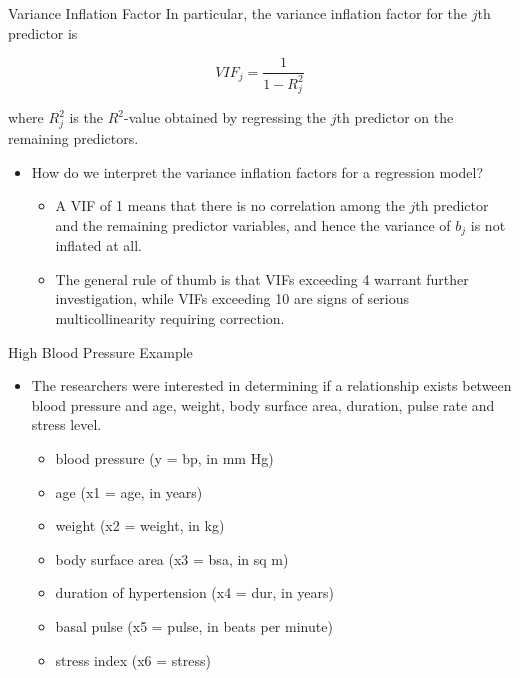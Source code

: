 \documentclass[
  ignorenonframetext,
]{beamer}
\providecommand{\tightlist}{%
  \setlength{\itemsep}{0pt}\setlength{\parskip}{0pt}}
\begin{document}
\begin{frame}{Variance Inflation Factor}
\label{variance-inflation-factor-1}
In particular, the variance inflation factor for the \(j\)th predictor
is

\[VIF_j=\frac{1}{1-R^2_j}\]

where \(R^2_j\) is the \(R^2\)-value obtained by regressing the \(j\)th
predictor on the remaining predictors.

\begin{itemize}
\item
  How do we interpret the variance inflation factors for a regression
  model?

  \begin{itemize}
  \tightlist
  \item
    A VIF of 1 means that there is no correlation among the \(j\)th
    predictor and the remaining predictor variables, and hence the
    variance of \(b_j\) is not inflated at all.
  \item
    The general rule of thumb is that VIFs exceeding 4 warrant further
    investigation, while VIFs exceeding 10 are signs of serious
    multicollinearity requiring correction.
  \end{itemize}
\end{itemize}
\end{frame}

\begin{frame}{High Blood Pressure Example}
\label{high-blood-pressure-example}
\begin{itemize}
\item
  The researchers were interested in determining if a relationship
  exists between blood pressure and age, weight, body surface area,
  duration, pulse rate and stress level.

  \begin{itemize}
  \tightlist
  \item
    blood pressure (y = bp, in mm Hg)
  \item
    age (x1 = age, in years)
  \item
    weight (x2 = weight, in kg)
  \item
    body surface area (x3 = bsa, in sq m)
  \item
    duration of hypertension (x4 = dur, in years)
  \item
    basal pulse (x5 = pulse, in beats per minute)
  \item
    stress index (x6 = stress)
  \end{itemize}
\end{itemize}
\end{frame}
\end{document}
